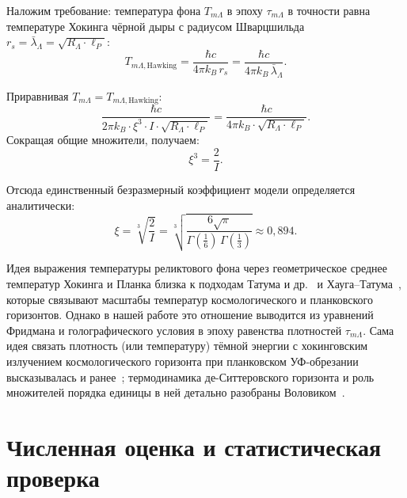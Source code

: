 \documentclass[12pt,a4paper]{article}
\begin{document}
Наложим требование: температура фона $T_{m\Lambda}$ в эпоху $\tau_{m\Lambda}$ в точности равна температуре Хокинга чёрной дыры с радиусом Шварцшильда $r_s = \bar\lambda_\Lambda = \sqrt{R_\Lambda \cdot \ell_P}$:
\begin{equation}
T_{m\Lambda\mathrm{, Hawking}} = \frac{\hbar c}{4\pi k_B\,r_s} = \frac{\hbar c}{4\pi k_B\,\bar\lambda_\Lambda}.
\end{equation}

Приравнивая $T_{m\Lambda} = T_{m\Lambda\mathrm{, Hawking}}$:
\begin{equation}
\frac{\hbar c}{2\pi k_B \cdot \xi^3 \cdot I \cdot \sqrt{R_\Lambda \cdot \ell_P}} = \frac{\hbar c}{4\pi k_B \cdot \sqrt{R_\Lambda \cdot \ell_P}}.
\end{equation}
Сокращая общие множители, получаем:
\begin{equation}
\xi^3 = \frac{2}{I}.
\end{equation}

Отсюда единственный безразмерный коэффициент модели определяется аналитически:
\begin{equation}
\boxed{\xi = \sqrt[3]{\frac{2}{I}} = \sqrt[3]{\frac{6\sqrt{\pi}}{\Gamma(\tfrac{1}{6})\,\Gamma(\tfrac{1}{3})}} \approx 0{,}894.}
\end{equation}

Идея выражения температуры реликтового фона через геометрическое среднее температур Хокинга и Планка близка к подходам Татума и др.~\cite{Tatum2015} и Хауга--Татума~\cite{Haug2024}, которые связывают масштабы температур космологического и планковского горизонтов. Однако в нашей работе это отношение выводится из уравнений Фридмана и голографического условия в эпоху равенства плотностей $\tau_{m\Lambda}$. Сама идея связать плотность (или температуру) тёмной энергии с хокинговским излучением космологического горизонта при планковском УФ-обрезании высказывалась и ранее~\cite{LeeLeeKim2010}; термодинамика де-Ситтеровского горизонта и роль множителей порядка единицы в ней детально разобраны Воловиком~\cite{Volovik2022}.

\section{Численная оценка и статистическая проверка}
\label{sec:empirical}
\end{document}
